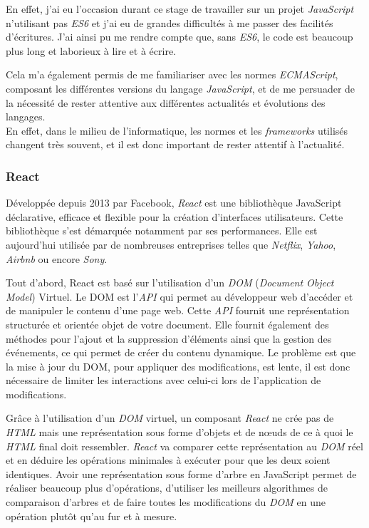 \bigskip

En effet, j'ai eu l'occasion durant ce stage de travailler sur un projet
\emph{JavaScript} n'utilisant pas \emph{ES6} et j'ai eu de grandes
difficultés à me passer des facilités d'écritures. J'ai ainsi pu me
rendre compte que, sans \emph{ES6}, le code est beaucoup plus long et
laborieux à lire et à écrire.

\bigskip

Cela m'a également permis de me familiariser avec les normes
\emph{ECMAScript}, composant les différentes versions du langage
\emph{JavaScript}, et de me persuader de la nécessité de rester
attentive aux différentes actualités et évolutions des langages.\\
En effet, dans le milieu de l'informatique, les normes et les
\emph{frameworks} utilisés changent très souvent, et il est donc
important de rester attentif à l'actualité.

\bigskip

\subsubsection{React}\label{react}

\bigskip

Développée depuis 2013 par Facebook, \emph{React} est une bibliothèque
JavaScript déclarative, efficace et flexible pour la création
d'interfaces utilisateurs. Cette bibliothèque s'est démarquée notamment
par ses performances. Elle est aujourd'hui utilisée par de nombreuses
entreprises telles que \emph{Netflix}, \emph{Yahoo}, \emph{Airbnb} ou
encore \emph{Sony}.

\bigskip

Tout d'abord, React est basé sur l'utilisation d'un \emph{DOM}
(\emph{Document Object Model}) Virtuel. Le DOM est l'\emph{API} qui
permet au développeur web d'accéder et de manipuler le contenu d'une
page web. Cette \emph{API} fournit une représentation structurée et
orientée objet de votre document. Elle fournit également des méthodes
pour l'ajout et la suppression d'éléments ainsi que la gestion des
événements, ce qui permet de créer du contenu dynamique. Le problème est
que la mise à jour du DOM, pour appliquer des modifications, est lente,
il est donc nécessaire de limiter les interactions avec celui-ci lors de
l'application de modifications. \bigskip

Grâce à l'utilisation d'un \emph{DOM} virtuel, un composant \emph{React}
ne crée pas de \emph{HTML} mais une représentation sous forme d'objets
et de nœuds de ce à quoi le \emph{HTML} final doit ressembler.
\emph{React} va comparer cette représentation au \emph{DOM} réel et en
déduire les opérations minimales à exécuter pour que les deux soient
identiques. Avoir une représentation sous forme d'arbre en JavaScript
permet de réaliser beaucoup plus d'opérations, d'utiliser les meilleurs
algorithmes de comparaison d'arbres et de faire toutes les modifications
du \emph{DOM} en une opération plutôt qu'au fur et à mesure.


